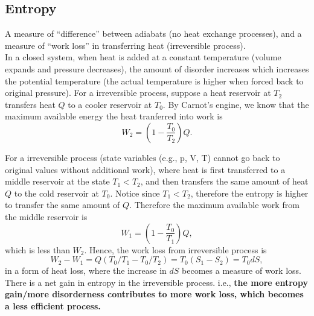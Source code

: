 \subsection{Entropy}
A measure of ``difference'' between adiabats (no heat exchange processes), and a measure of ``work loss'' in transferring heat (irreversible process). \\

In a closed system, when heat is added at a constant temperature (volume expands and pressure decreases),
the amount of disorder increases which increases the potential temperature (the actual temperature is higher when forced back to original pressure).
For a irreversible process, suppose a heat reservoir at $T_2$ transfers heat $Q$ to a cooler reservoir at $T_0$.
By Carnot's engine, we know that the maximum available energy the heat tranferred into work is
\begin{equation}
    W_2 = (1-\frac{T_0}{T_2})Q.
\end{equation}

For a irreversible process (state variables (e.g., p, V, T) cannot go back to original values without additional work), 
where heat is first transferred to a middle reservoir at the state $T_1 < T_2$, 
and then transfers the same amount of heat $Q$ to the cold reservoir at $T_0$.
Notice since $T_1 < T_2$, therefore the entropy is higher to transfer the same amount of $Q$.
Therefore the maximum available work from the middle reservoir is
\begin{equation}
    W_1 = (1-\frac{T_0}{T_1})Q,
\end{equation}
which is less than $W_2$.
Hence, the work loss from irreversible process is 
\begin{equation}
    W_2-W_1 = Q(T_0/T_1 - T_0/T_2) = T_0(S_1 - S_2) = T_0 dS,
\end{equation} 
in a form of heat loss, where the increase in $dS$ becomes a measure of work loss. 
There is a net gain in entropy in the irreversible process.
i.e., \bf{the more entropy gain/more disorderness contributes to more work loss, which becomes a less efficient process.}


